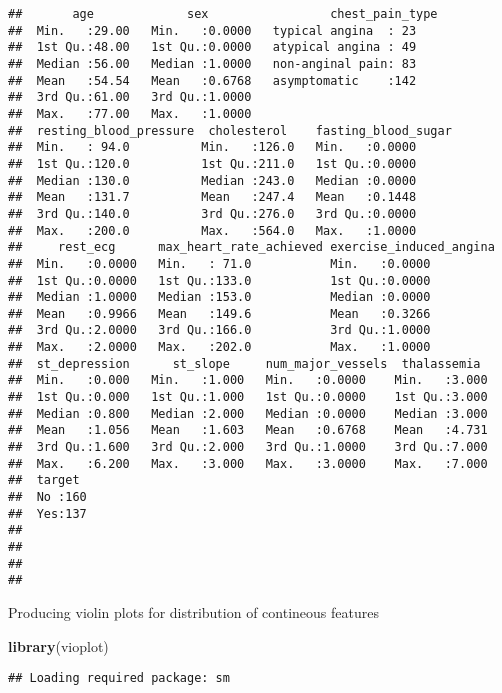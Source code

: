 \documentclass[]{article}
\newenvironment{Shaded}{\begin{snugshade}}{\end{snugshade}}
\newcommand{\KeywordTok}[1]{\textcolor[rgb]{0.13,0.29,0.53}{\textbf{#1}}}
\newcommand{\NormalTok}[1]{#1}
\begin{document}
\begin{verbatim}
##       age             sex                 chest_pain_type
##  Min.   :29.00   Min.   :0.0000   typical angina  : 23   
##  1st Qu.:48.00   1st Qu.:0.0000   atypical angina : 49   
##  Median :56.00   Median :1.0000   non-anginal pain: 83   
##  Mean   :54.54   Mean   :0.6768   asymptomatic    :142   
##  3rd Qu.:61.00   3rd Qu.:1.0000                          
##  Max.   :77.00   Max.   :1.0000                          
##  resting_blood_pressure  cholesterol    fasting_blood_sugar
##  Min.   : 94.0          Min.   :126.0   Min.   :0.0000     
##  1st Qu.:120.0          1st Qu.:211.0   1st Qu.:0.0000     
##  Median :130.0          Median :243.0   Median :0.0000     
##  Mean   :131.7          Mean   :247.4   Mean   :0.1448     
##  3rd Qu.:140.0          3rd Qu.:276.0   3rd Qu.:0.0000     
##  Max.   :200.0          Max.   :564.0   Max.   :1.0000     
##     rest_ecg      max_heart_rate_achieved exercise_induced_angina
##  Min.   :0.0000   Min.   : 71.0           Min.   :0.0000         
##  1st Qu.:0.0000   1st Qu.:133.0           1st Qu.:0.0000         
##  Median :1.0000   Median :153.0           Median :0.0000         
##  Mean   :0.9966   Mean   :149.6           Mean   :0.3266         
##  3rd Qu.:2.0000   3rd Qu.:166.0           3rd Qu.:1.0000         
##  Max.   :2.0000   Max.   :202.0           Max.   :1.0000         
##  st_depression      st_slope     num_major_vessels  thalassemia   
##  Min.   :0.000   Min.   :1.000   Min.   :0.0000    Min.   :3.000  
##  1st Qu.:0.000   1st Qu.:1.000   1st Qu.:0.0000    1st Qu.:3.000  
##  Median :0.800   Median :2.000   Median :0.0000    Median :3.000  
##  Mean   :1.056   Mean   :1.603   Mean   :0.6768    Mean   :4.731  
##  3rd Qu.:1.600   3rd Qu.:2.000   3rd Qu.:1.0000    3rd Qu.:7.000  
##  Max.   :6.200   Max.   :3.000   Max.   :3.0000    Max.   :7.000  
##  target   
##  No :160  
##  Yes:137  
##           
##           
##           
## 
\end{verbatim}

Producing violin plots for distribution of contineous features

\begin{Shaded}
\begin{Highlighting}[]
\KeywordTok{library}\NormalTok{(vioplot)}
\end{Highlighting}
\end{Shaded}

\begin{verbatim}
## Loading required package: sm
\end{verbatim}
\end{document}
